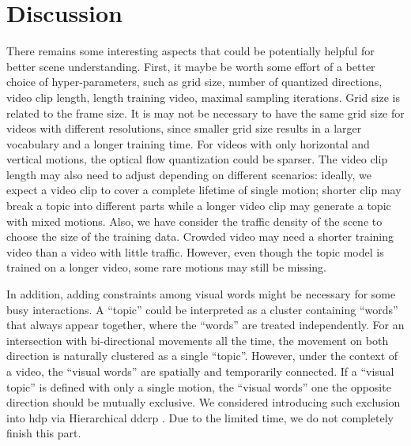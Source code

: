 \section{Discussion}

There remains some interesting aspects that could be potentially helpful for better scene understanding.
First, it maybe be worth some effort of a better choice of hyper-parameters, such as grid size, number of quantized directions, video clip length, length training video, maximal sampling iterations.
Grid size is related to the frame size. It is may not be necessary to have the same grid size for videos with different resolutions, since smaller grid size results in a larger vocabulary and a longer training time.
For videos with only horizontal and vertical motions, the optical flow quantization could be sparser. 
The video clip length may also need to adjust depending on different scenarios: ideally, we expect a video clip to cover a complete lifetime of single motion; shorter clip may break a topic into different parts while a longer video clip may generate a topic with mixed motions. 
Also, we have consider the traffic density of the scene to choose the size of the training data. Crowded video may need a shorter training video than a video with little traffic.
However, even though the topic model is trained on a longer video, some rare motions may still be missing.

In addition, adding constraints among visual words might be necessary for some busy interactions. 
A ``topic'' could be interpreted as a cluster containing ``words'' that always appear together, where the ``words'' are treated independently.
For an intersection with bi-directional movements all the time, the movement on both direction is naturally clustered as a single ``topic''. 
However, under the context of a video, the ``visual words'' are spatially and temporarily connected. 
If a ``visual topic'' is defined with only a single motion, the ``visual words'' one the opposite direction should be mutually exclusive.
We considered introducing such exclusion into \gls{hdp} via Hierarchical \gls{ddcrp} \cite{blei2011distance}.
Due to the limited time, we do not completely finish this part.